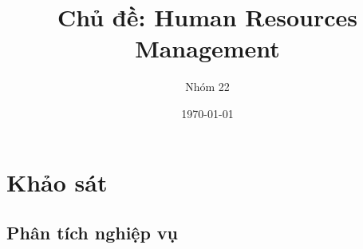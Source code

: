 \documentclass{beamer}
\title[{\makebox[.15\paperwidth]{Human Resources Management}}]{Chủ đề: Human Resources Management}
\author[Nhóm 22]{Nhóm 22}
\date[Data Warehouse \& BI]{\today}
\begin{document}



\section{Khảo sát}
\subsection{Phân tích nghiệp vụ}
\end{document}
